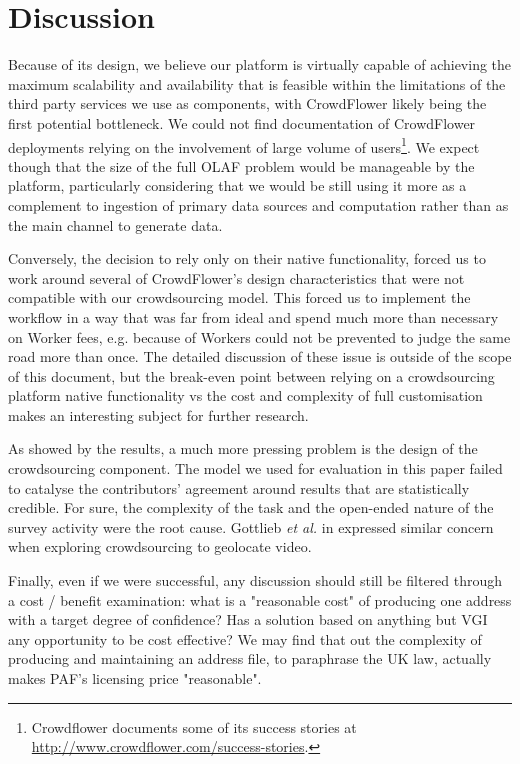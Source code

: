 \section{Discussion}

Because of its design, we believe our platform is virtually capable of achieving the maximum scalability and availability that is feasible within the limitations of the third party services we use as components, with CrowdFlower likely being the first potential bottleneck. We could not find documentation of CrowdFlower deployments relying on the involvement of large volume of users\footnote{Crowdflower documents some of its success stories at \url{http://www.crowdflower.com/success-stories}.}. We expect though that the size of the full OLAF problem would be manageable by the platform, particularly considering that we would be still using it more as a complement to ingestion of primary data sources and computation rather than as the main channel to generate data.

Conversely, the decision to rely only on their native functionality, forced us to work around several of CrowdFlower's design characteristics that were not compatible with our crowdsourcing model. This forced us to implement the workflow in a way that was far from ideal and spend much more than necessary on Worker fees, e.g. because of Workers could not be prevented to judge the same road more than once. The detailed discussion of these issue is outside of the scope of this document, but the break-even point between relying on a crowdsourcing platform native functionality vs the cost and complexity of full customisation makes an interesting subject for further research.

As showed by the results, a much more pressing problem is the design of the crowdsourcing component. The model we used for evaluation in this paper failed to catalyse the contributors' agreement around results that are statistically credible. For sure, the complexity of the task and the open-ended nature of the survey activity were the root cause. Gottlieb {\it et al.} in \cite{Gottlieb:2012fh} expressed similar concern when exploring crowdsourcing to geolocate video.

Finally, even if we were successful, any discussion should still be filtered through a cost / benefit examination: what is a "reasonable cost" of producing one address with a target degree of confidence? Has a solution based on anything but VGI any opportunity to be cost effective? We may find that out the complexity of producing and maintaining an address file, to paraphrase the UK law, actually makes PAF's licensing price "reasonable".
